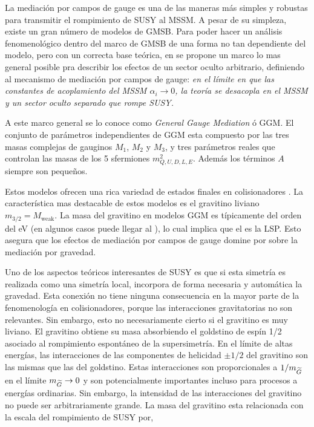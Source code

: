 
La mediación por campos de gauge es una de las maneras más simples y robustas
para transmitir el rompimiento de SUSY al MSSM. A pesar de su simpleza, existe
un gran número de modelos de GMSB. Para poder hacer un análisis fenomenológico
dentro del marco de GMSB de una forma no tan dependiente del modelo, pero con un
correcta base teórica, en \cite{GGM} se propone un marco lo mas general posible
pra describir los efectos de un sector oculto arbitrario,
definiendo al mecanismo de mediación por campos de gauge:
\emph{en el límite en que las constantes de acoplamiento del MSSM $\alpha_i \to
  0$, la teoría se desacopla en el MSSM y un sector oculto separado que rompe
  SUSY.}

A este marco general se lo conoce como \emph{General Gauge Mediation} ó GGM. El
conjunto de parámetros independientes de GGM esta compuesto por las tres masas
complejas de gauginos $M_1$, $M_2$ y $M_3$, y tres parámetros reales que
controlan las masas de los 5 sfermiones $m^2_{Q,U,D,L,E}$. Además los términos
$A$ siempre son pequeños.

Estos modelos ofrecen una rica variedad de estados finales en colisionadores
\cite{0911.4130}. La característica mas destacable de estos modelos es el
gravitino liviano $m_{3/2} = M_\text{weak}$. La masa del gravitino en modelos
GGM es típicamente del orden del eV (en algunos casos puede llegar al \gev), lo
cual implica que el {\gravino} es la LSP. Esto asegura que los efectos de
mediación por campos de gauge domine por sobre la mediación por gravedad.

Uno de los aspectos teóricos interesantes de SUSY es que si esta simetría es
realizada como una simetría local, incorpora de forma necesaria y automática la
gravedad. Esta conexión no tiene ninguna consecuencia en la mayor parte de la
fenomenología en colisionadores, porque las interacciones gravitatorias no son
relevantes. Sin embargo, esto no necesariamente cierto si el gravitino es muy
liviano. El gravitino obtiene su masa absorbiendo el goldstino de espín 1/2
asociado al rompimiento espontáneo de la supersimetría. En el límite de altas
energías, las interacciones de las componentes de helicidad $\pm 1/2$ del
gravitino son las mismas que las del goldstino. Estas interacciones son
proporcionales a $1/m_{\widetilde{G}}$ en el límite $m_{\widetilde{G}} \rightarrow 0$ y son
potencialmente importantes incluso para procesos a energías ordinarias. Sin
embargo, la intensidad de las interacciones del gravitino no puede ser
arbitrariamente grande. La masa del gravitino esta relacionada con la escala del
rompimiento de SUSY por,

